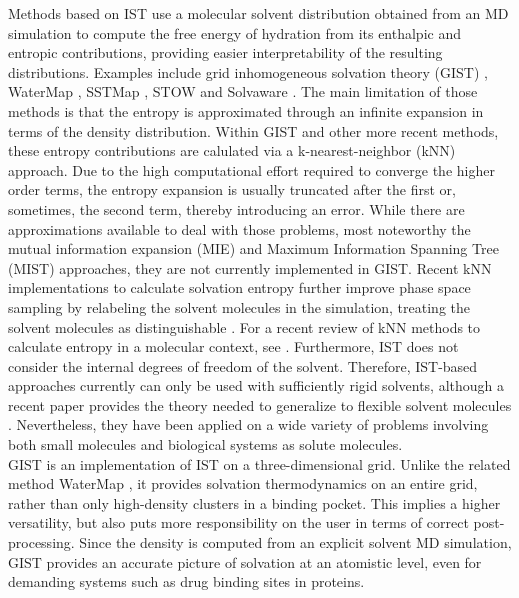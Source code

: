 \documentclass[9pt,tutorial]{livecoms}
\begin{document}
Methods based on IST use a molecular solvent distribution obtained from an MD simulation to compute the free energy of hydration from its enthalpic and entropic contributions, providing easier interpretability of the resulting distributions.
Examples include grid inhomogeneous solvation theory (GIST) \cite{Nguyen2012,Ramsey2016}, WaterMap \cite{Young2007-watermap,Abel2008-watermap}, SSTMap \cite{Haider2018-sstmap}, STOW \cite{Li2012-stow} and Solvaware \cite{Huggins2016-solvaware}.
The main limitation of those methods is that the entropy is approximated through an infinite expansion in terms of the density distribution. 
Within GIST and other more recent methods, these entropy contributions are calulated via a k-nearest-neighbor (kNN) approach.  
Due to the high computational effort required to converge the higher order terms, the entropy expansion is usually truncated after the first or, sometimes, the second \cite{Nguyen2016-gist-second-order,Waibl2022-gist-solvents} term, thereby introducing an error.
While there are approximations available to deal with those problems, most noteworthy the mutual information expansion (MIE) and Maximum Information Spanning Tree (MIST) approaches, they are not currently implemented in GIST. 
Recent kNN implementations to calculate solvation entropy further improve phase space sampling by relabeling the solvent molecules in the simulation, treating the solvent molecules as distinguishable \cite{reinhard2007estimation,heinz2019computing,heinz2021permut,fogolari2021optimal}. For a recent review of kNN methods to calculate entropy in a molecular context, see \cite{fogolari2024k}.
Furthermore, IST does not consider the internal degrees of freedom of the solvent.
Therefore, IST-based approaches currently can only be used with sufficiently rigid solvents, although a recent paper provides the theory needed to generalize to flexible solvent molecules \cite{gilson2024freeenergy}.
Nevertheless, they have been applied on a wide variety of problems involving both small molecules and biological systems as solute molecules.\\
GIST is an implementation of IST on a three-dimensional grid. 
Unlike the related method WaterMap \cite{Abel2008-watermap,Young2007-watermap}, it provides solvation thermodynamics on an entire grid, rather than only high-density clusters in a binding pocket.
This implies a higher versatility, but also puts more responsibility on the user in terms of correct post-processing.
Since the density is computed from an explicit solvent MD simulation, GIST provides an accurate picture of solvation at an atomistic level, even for demanding systems such as drug binding sites in proteins.
\end{document}
